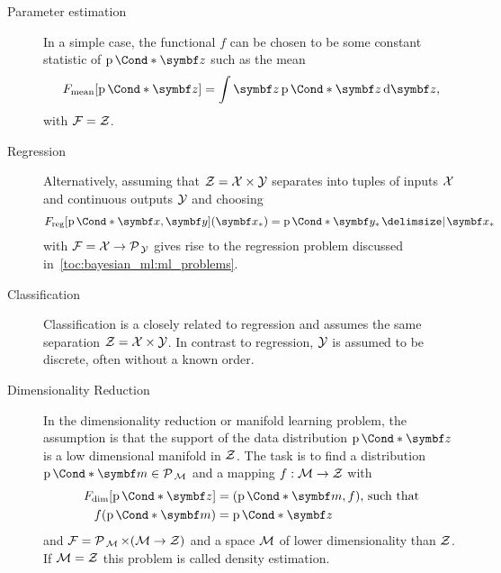 \begin{problem}
\begin{description}
    \item[Parameter estimation]
          In a simple case, the functional $f$ can be chosen to be some constant statistic of $\Prob*{\mat{z}}$ such as the mean
          \begin{align}
              F_{\text{mean}}[\Prob*{\mat{z}}] = \int \mat{z} \Prob*{\mat{z}} \diff \mat{z},
          \end{align}
          with $\mathcal{F} = \mathcal{Z}$.
    \item[Regression]
          Alternatively, assuming that $\mathcal{Z} = \mathcal{X} \times \mathcal{Y}$ separates into tuples of inputs $\mathcal{X}$ and continuous outputs $\mathcal{Y}$ and choosing
          \begin{align}
              \label{eq:bayesian_ml:f_reg}
              F_{\text{reg}}[\Prob*{\mat{x}, \mat{y}}](\mat{x}_\ast) = \Prob*{\mat{y}_\ast \given \mat{x}_\ast}
          \end{align}
          with $\mathcal{F} = \mathcal{X} \to \operatorname{\mathcal{P}\mkern2mu}_{\mathcal{Y}}$ gives rise to the regression problem discussed in~\cref{toc:bayesian_ml:ml_problems}.
    \item[Classification]
          Classification is a closely related to regression and assumes the same separation $\mathcal{Z} = \mathcal{X} \times \mathcal{Y}$.
          In contrast to regression, $\mathcal{Y}$ is assumed to be discrete, often without a known order.
    \item[Dimensionality Reduction]
          In the dimensionality reduction or manifold learning problem, the assumption is that the support of the data distribution $\Prob*{\mat{z}}$ is a low dimensional manifold in $\mathcal{Z}$.
          The task is to find a distribution $\Prob*{\mat{m}} \in \Probs{\Mc}$ and a mapping $f : \mathcal{M} \to \mathcal{Z}$ with
          \begin{align}
              \begin{split}
                  F_{\text{dim}}[\Prob*{\mat{z}}] & = (\Prob*{\mat{m}}, f)\text{, such that} \\
                  f(\Prob*{\mat{m}})              & = \Prob*{\mat{z}}
              \end{split}
          \end{align}
          and $\mathcal{F} = \operatorname{\mathcal{P}\mkern2mu}_{\mathcal{M}} \times (\mathcal{M} \to \mathcal{Z})$ and a space $\mathcal{M}$ of lower dimensionality than $\mathcal{Z}$.
          If $\mathcal{M} = \mathcal{Z}$ this problem is called density estimation.
\end{description}
\end{problem}

